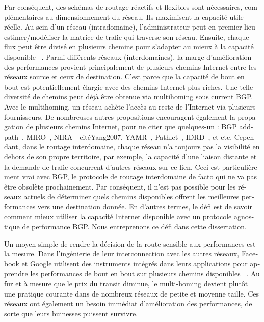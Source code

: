 \begin{otherlanguage}{french}
Par conséquent, des schémas de routage réactifs et flexibles sont nécessaires, complémentaires au dimensionnement du réseau.
Ils maximisent la capacité utile réelle.
Au sein d'un réseau (intradomaine), l'administrateur peut en premier lieu estimer/modéliser la matrice de trafic qui traverse son réseau. 
Ensuite, chaque flux peut être divisé en plusieurs chemins pour s'adapter au mieux à la capacité disponible ~\cite {Xu2011, Jain2013}.
Parmi différents réseaux (interdomaines), la marge d'amélioration des performances provient principalement de plusieurs chemins Internet entre les réseaux source et ceux de destination.
C'est parce que la capacité de bout en bout est potentiellement élargie avec des chemins Internet plus riches.
Une telle diversité de chemins peut déjà être obtenue via multihoming sous current \acf{BGP}. Avec le multihoming, un réseau achète l'accès au reste de l'Internet via plusieurs fournisseurs.
De nombreuses autres propositions encouragent également la propagation de plusieurs chemins Internet, pour ne citer que quelques-un : BGP add-path~\cite{addpath}, MIRO~\cite{Xu2006}, NIRA~\ cité{Yang2007}, YAMR~\cite{Ganichev2010 }, Pathlet~\cite{Godfrey09}, IDRD~\cite{Misseri2013}, et etc.
Cependant, dans le routage interdomaine, chaque réseau n'a toujours pas la visibilité en dehors de son propre territoire, par exemple, la capacité d'une liaison distante et la demande de trafic concurrent d'autres réseaux sur ce lien.
Ceci est particulièrement vrai avec \ac{BGP}, le protocole de routage interdomaine de facto qui ne va pas être obsolète prochainement.
Par conséquent, il n'est pas possible pour les réseaux actuels de déterminer quels chemins disponibles offrent les meilleures performances vers une destination donnée.
En d'autres termes, le défi est de savoir comment mieux utiliser la capacité Internet disponible avec un protocole agnostique de performance \ac{BGP}.
Nous entreprenons ce défi dans cette dissertation.

Un moyen simple de rendre la décision de la route sensible aux performances est la mesure. Dans l'ingénierie de leur interconnection avec les autres réseaux, Facebook et Google utilisent des instruments intégrés dans leurs applications pour apprendre les performances de bout en bout sur plusieurs chemins disponibles ~\cite {Yap2017, Schlinker2017}.
Au fur et à mesure que le prix du transit diminue, le multi-homing devient plutôt une pratique courante dans de nombreux réseaux de petite et moyenne taille.
Ces réseaux ont également un besoin immédiat d'amélioration des performances, de sorte que leurs buinesses puissent survivre.


\end{otherlanguage}
